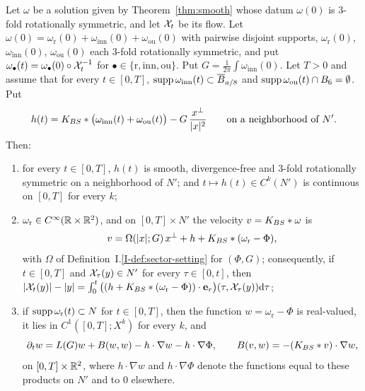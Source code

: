 \begin{lemma}
\label{lem:reduction}
Let $\omega$ be a solution given by Theorem~\ref{thm:smooth} whose datum
$\omega(0)$ is $3$-fold rotationally symmetric, and let $\mathcal{X}_t$ be its flow. Let
$\omega(0)=\omega_{\mathrm r}(0)+\omega_{\mathrm{inn}}(0)+\omega_{\mathrm{ou}}(0)$ with
pairwise disjoint supports, $\omega_{\mathrm r}(0)$, $\omega_{\mathrm{inn}}(0)$,
$\omega_{\mathrm{ou}}(0)$ each $3$-fold rotationally symmetric, and put
$\omega_\bullet(t)=\omega_\bullet(0)\circ\mathcal{X}_t^{-1}$ for
$\bullet\in\{\mathrm r,\mathrm{inn},\mathrm{ou}\}$. Put
$G=\frac1{2\pi}\int\omega_{\mathrm{inn}}(0)$. Let $T>0$ and assume that for every
$t\in[0,T]$, $\operatorname{supp}\omega_{\mathrm{inn}}(t)\subset\overline B_{a/8}$ and
$\operatorname{supp}\omega_{\mathrm{ou}}(t)\cap B_6=\emptyset$. Put
\[
h(t)=K_{BS}\ast\big(\omega_{\mathrm{inn}}(t)+\omega_{\mathrm{ou}}(t)\big)-G\,\frac{x^\perp}{|x|^2}
\qquad\text{on a neighborhood of }N'.
\]
Then:
\begin{enumerate}[label=\textup{(\arabic*)}]
\item for every $t\in[0,T]$, $h(t)$ is smooth, divergence-free and
  $3$-fold rotationally symmetric on a neighborhood of $N'$; and $t\mapsto h(t)\in C^k(N')$ is
  continuous on $[0,T]$ for every $k$;
\item $\omega_{\mathrm r}\in C^\infty(\mathbb{R}\times\mathbb{R}^2)$, and on $[0,T]\times N'$ the
  velocity $v=K_{BS}\ast\omega$ is
  \[
  v=\Omega(|x|;G)\,x^\perp+h+K_{BS}\ast(\omega_{\mathrm r}-\Phi),
  \]
  with $\Omega$ of Definition~I.\ref{I-def:sector-setting} for $(\Phi,G)$; consequently,
  if $t\in[0,T]$ and $\mathcal{X}_\tau(y)\in N'$ for every $\tau\in[0,t]$, then
  $|\mathcal{X}_t(y)|-|y|=\int_0^t\big((h+K_{BS}\ast(\omega_{\mathrm r}-\Phi))\cdot\textbf{e}_r\big)(\tau,\mathcal{X}_\tau(y))\dd\tau$;
\item if $\operatorname{supp}\omega_{\mathrm r}(t)\subset N$ for $t\in[0,T]$, then the function
  $w=\omega_{\mathrm r}-\Phi$ is real-valued, it lies in $C^1([0,T];X^k)$ for
  every $k$, and
  \begin{equation}
  \label{eq:ring}
  \partial_tw=L(G)w+B(w,w)-h\cdot\nabla w-h\cdot\nabla\Phi,\qquad B(v,w)=-(K_{BS}\ast v)\cdot\nabla w,
  \end{equation}
  on $[0,T]\times\mathbb{R}^2$, where $h\cdot\nabla w$ and $h\cdot\nabla\Phi$ denote the
  functions equal to these products on $N'$ and to $0$ elsewhere.
\end{enumerate}
\end{lemma}
